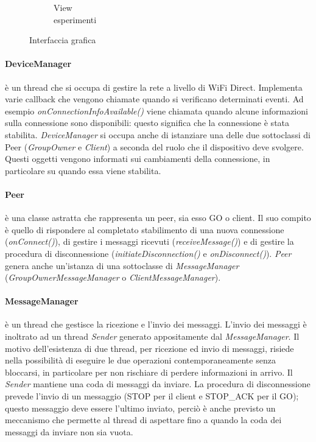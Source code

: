 \documentclass{llncs}
\begin{document}
\begin{figure}
\begin{subfigure}{.33\textwidth}
		\caption{View\\ esperimenti}
		\label{fig:sub3}
	\end{subfigure}
	\caption{Interfaccia grafica}
	\label{fig:gui}
\end{figure}

\paragraph{DeviceManager} è un thread che si occupa di gestire la rete a livello di WiFi Direct. Implementa varie callback che vengono chiamate quando si verificano determinati eventi.
Ad esempio \emph{onConnectionInfoAvailable()} viene chiamata quando alcune informazioni sulla connessione sono disponibili: questo significa che la connessione è stata stabilita.
\emph{DeviceManager} si occupa anche di istanziare una delle due sottoclassi di Peer (\emph{GroupOwner} e \emph{Client}) a seconda del ruolo che il dispositivo deve svolgere. Questi oggetti vengono informati sui cambiamenti della connessione, in particolare su quando essa viene stabilita.

\paragraph{Peer} è una classe astratta che rappresenta un peer, sia esso GO o client. Il suo compito è quello di rispondere al completato stabilimento di una nuova connessione (\emph{onConnect()}), 
di gestire i messaggi ricevuti (\emph{receiveMessage()}) e di gestire la procedura di disconnessione (\emph{initiateDisconnection()} e \emph{onDisconnect()}). 
\emph{Peer} genera anche un'istanza di una sottoclasse di \emph{MessageManager} (\emph{GroupOwnerMessageManager} o \emph{ClientMessageManager}).

\paragraph{MessageManager} è un thread che gestisce la ricezione e l'invio dei messaggi. L'invio dei messaggi è inoltrato ad un thread \emph{Sender} generato appositamente dal \emph{MessageManager}. Il motivo dell'esistenza di due thread, per ricezione ed invio di messaggi, risiede nella possibilità di eseguire le due operazioni contemporaneamente senza bloccarsi, in particolare per non rischiare di perdere informazioni in arrivo. Il \emph{Sender} mantiene 
una coda di messaggi da inviare. La procedura di disconnessione prevede l'invio di un messaggio (STOP per il client e STOP\_ACK per il GO); questo messaggio deve essere l'ultimo inviato, perciò è anche previsto un meccanismo che 
permette al thread di aspettare fino a quando la coda dei messaggi da inviare non sia vuota.
\end{document}
